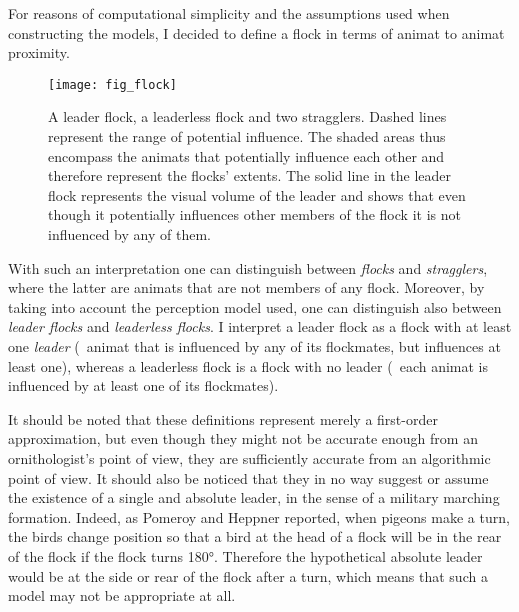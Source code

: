 For reasons of computational simplicity and the assumptions used when constructing the models, I decided to define a flock in terms of animat to animat proximity. 

\begin{figure}
  \texttt{[image: fig\_flock]}
  \caption{A leader flock, a leaderless flock and two stragglers. Dashed lines represent the range of potential influence. The shaded areas thus encompass the animats that potentially influence each other and therefore represent the flocks' extents. The solid line in the leader flock represents the visual volume of the leader and shows that even though it potentially influences other members of the flock it is not influenced by any of them.}
  \label{fig:flock}
\end{figure}

With such an interpretation one can distinguish between \emph{flocks} and \emph{stragglers}, where the latter are animats that are not members of any flock. Moreover, by taking into account the perception model used, one can distinguish also between \emph{leader flocks} and \emph{leaderless flocks}. I interpret a leader flock as a flock with at least one \emph{leader} (\ie\ animat that is  influenced by any of its flockmates, but influences at least one), whereas a leaderless flock is a flock with no leader (\ie\ each animat is influenced by at least one of its flockmates).

It should be noted that these definitions represent merely a first-order approximation, but even though they might not be accurate enough from an ornithologist's point of view, they are sufficiently accurate from an algorithmic point of view. It should also be noticed that they in no way suggest or assume the existence of a single and absolute leader, in the sense of a military marching formation. Indeed, as Pomeroy and Heppner \cite{pomeroy:1992} reported, when pigeons make a turn, the birds change position so that a bird at the head of a flock will be in the rear of the flock if the flock turns \ang{180}. Therefore the hypothetical absolute leader would be at the side or rear of the flock after a turn, which means that such a model may not be appropriate at all.

